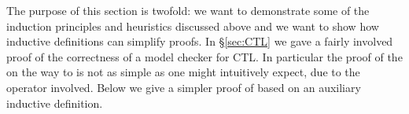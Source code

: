 %
\begin{isabellebody}%
\def\isabellecontext{CTLind}%
%
%
\begin{isamarkuptext}%
\label{sec:CTL-revisited}
The purpose of this section is twofold: we want to demonstrate
some of the induction principles and heuristics discussed above and we want to
show how inductive definitions can simplify proofs.
In \S\ref{sec:CTL} we gave a fairly involved proof of the correctness of a
model checker for CTL. In particular the proof of the
 on the way to  is not as
simple as one might intuitively expect, due to the  operator
involved. Below we give a simpler proof of 
based on an auxiliary inductive definition.


\end{isamarkuptext}
\end{isabellebody}
